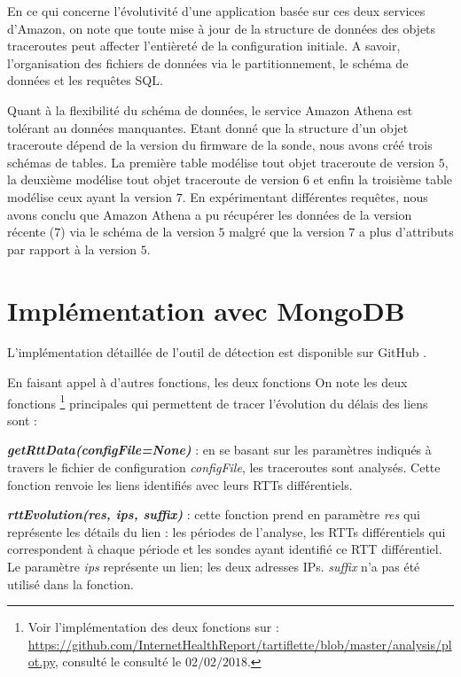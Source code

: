 En ce qui concerne l'évolutivité d'une application basée sur ces deux services d'Amazon, on note que toute mise à jour de la structure de données des objets traceroutes peut affecter l'entièreté de la configuration initiale. A savoir, l'organisation des fichiers de données via le partitionnement, le schéma de données et les requêtes SQL.

Quant à la flexibilité du schéma de données, le service  Amazon Athena est tolérant au données manquantes. Etant donné que la structure d'un objet traceroute dépend de la version du firmware de la sonde, nous avons créé trois schémas de tables. La première table  modélise tout objet traceroute de  version $5$, la deuxième modélise tout objet traceroute de version $6$ et enfin la troisième table modélise ceux ayant la version $7$. En expérimentant différentes requêtes, nous avons conclu  que Amazon Athena a pu récupérer les données de la version récente ($7$) via le schéma de la version $5$ malgré que la version $7$ a plus d'attributs par rapport à la version $5$.


\section{Implémentation avec MongoDB}

L'implémentation détaillée de l'outil de détection est disponible sur GitHub \cite{InternetHealthReport}.  

En faisant appel à d'autres fonctions, les deux fonctions 
On note les deux fonctions \footnote{Voir l'implémentation des deux fonctions sur : \url{https://github.com/InternetHealthReport/tartiflette/blob/master/analysis/plot.py}, consulté le consulté le $ 02/02/2018$.} principales qui permettent de tracer l'évolution du délais des liens sont  :  

\textit{\textbf{getRttData(configFile=None)}} : en se basant sur les paramètres indiqués à travers le fichier de configuration \textit{configFile}, les traceroutes sont analysés. Cette fonction renvoie les liens identifiés avec leurs RTTs différentiels.

\textit{\textbf{rttEvolution(res, ips, suffix)}} : cette fonction prend en paramètre \textit{res} qui représente les détails du lien : les périodes de l'analyse, les RTTs différentiels qui correspondent à chaque période et les sondes ayant identifié ce RTT différentiel. Le paramètre \textit{ips} représente un lien; les deux adresses IPs.  \textit{suffix} n'a pas été utilisé dans la fonction.
 


